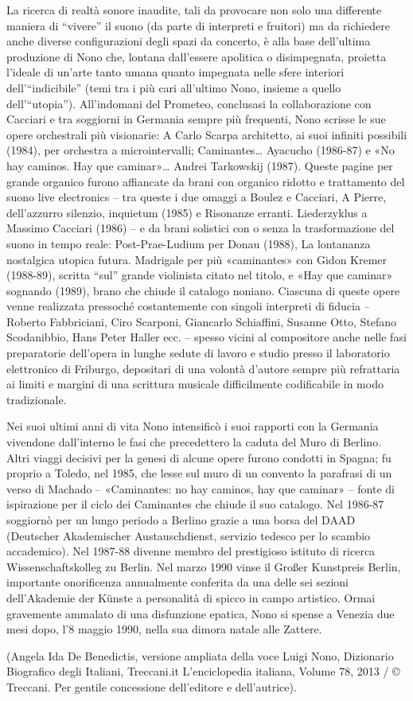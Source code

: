 La ricerca di realtà sonore inaudite, tali da provocare non solo una differente maniera di “vivere” il suono (da parte di interpreti e fruitori) ma da richiedere anche diverse configurazioni degli spazi da concerto, è alla base dell’ultima produzione di Nono che, lontana dall’essere apolitica o disimpegnata, proietta l’ideale di un’arte tanto umana quanto impegnata nelle sfere interiori dell’“indicibile” (temi tra i più cari all’ultimo Nono, insieme a quello dell’“utopia”). All’indomani del Prometeo, conclusasi la collaborazione con Cacciari e tra soggiorni in Germania sempre più frequenti, Nono scrisse le sue opere orchestrali più visionarie: A Carlo Scarpa architetto, ai suoi infiniti possibili (1984), per orchestra a microintervalli; Caminantes… Ayacucho (1986-87) e «No hay caminos. Hay que caminar»… Andrei Tarkowskij (1987). Queste pagine per grande organico furono affiancate da brani con organico ridotto e trattamento del suono live electronics – tra queste i due omaggi a Boulez e Cacciari, A Pierre, dell’azzurro silenzio, inquietum (1985) e Risonanze erranti. Liederzyklus a Massimo Cacciari (1986) – e da brani solistici con o senza la trasformazione del suono in tempo reale: Post-Prae-Ludium per Donau (1988), La lontananza nostalgica utopica futura. Madrigale per più «caminantes» con Gidon Kremer (1988-89), scritta “sul” grande violinista citato nel titolo, e «Hay que caminar» sognando (1989), brano che chiude il catalogo noniano. Ciascuna di queste opere venne realizzata pressoché costantemente con singoli interpreti di fiducia – Roberto Fabbriciani, Ciro Scarponi, Giancarlo Schiaffini, Susanne Otto, Stefano Scodanibbio, Hans Peter Haller ecc. – spesso vicini al compositore anche nelle fasi preparatorie dell’opera in lunghe sedute di lavoro e studio presso il laboratorio elettronico di Friburgo, depositari di una volontà d’autore sempre più refrattaria ai limiti e margini di una scrittura musicale difficilmente codificabile in modo tradizionale.

Nei suoi ultimi anni di vita Nono intensificò i suoi rapporti con la Germania vivendone dall’interno le fasi che precedettero la caduta del Muro di Berlino. Altri viaggi decisivi per la genesi di alcune opere furono condotti in Spagna; fu proprio a Toledo, nel 1985, che lesse sul muro di un convento la parafrasi di un verso di Machado – «Caminantes: no hay caminos, hay que caminar» – fonte di ispirazione per il ciclo dei Caminantes che chiude il suo catalogo. Nel 1986-87 soggiornò per un lungo periodo a Berlino grazie a una borsa del DAAD (Deutscher Akademischer Austauschdienst, servizio tedesco per lo scambio accademico). Nel 1987-88 divenne membro del prestigioso istituto di ricerca Wissenschaftskolleg zu Berlin. Nel marzo 1990 vinse il Großer Kunstpreis Berlin, importante onorificenza annualmente conferita da una delle sei sezioni dell’Akademie der Künste a personalità di spicco in campo artistico. Ormai gravemente ammalato di una disfunzione epatica, Nono si spense a Venezia due mesi dopo, l’8 maggio 1990, nella sua dimora natale alle Zattere.

(Angela Ida De Benedictis, versione ampliata della voce Luigi Nono, Dizionario Biografico degli Italiani, Treccani.it L’enciclopedia italiana, Volume 78, 2013 / © Treccani. Per gentile concessione dell’editore e dell’autrice).
